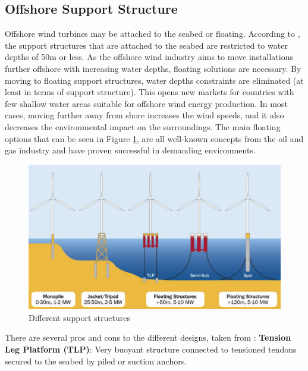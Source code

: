 \subsection{Offshore Support Structure}
Offshore wind turbines may be attached to the seabed or floating. According to \cite{IRENA2016}, the support structures that are attached to the seabed are restricted to water depths of 50m or less. As the offshore wind industry aims to move installations further offshore with increasing water depths, floating solutions are necessary. By moving to floating support structures, water depths constraints are eliminated (at least in terms of support structure). This opens new markets for countries with few shallow water areas suitable for offshore wind energy production. In most cases, moving further away from shore increases the wind speeds, and it also decreases the environmental impact on the surroundings. The main floating options that can be seen in Figure \ref{fig:supstruc}, are all well-known concepts from the oil and gas industry and have proven successful in demanding environments. 

\begin{figure}[H]
\centering
\includegraphics[scale=0.6]{figures/supstruc}
\caption[$\; \:$Different support structures]{Different support structures \cite{Bailey2014}}
 \label{fig:supstruc}
\end{figure}

\noindent There are several pros and cons to the different designs, taken from \cite{IRENA2016}: \newline
\newline
\textbf{Tension Leg Platform (TLP)}: Very buoyant structure connected to tensioned tendons secured to the seabed by piled or suction anchors.

